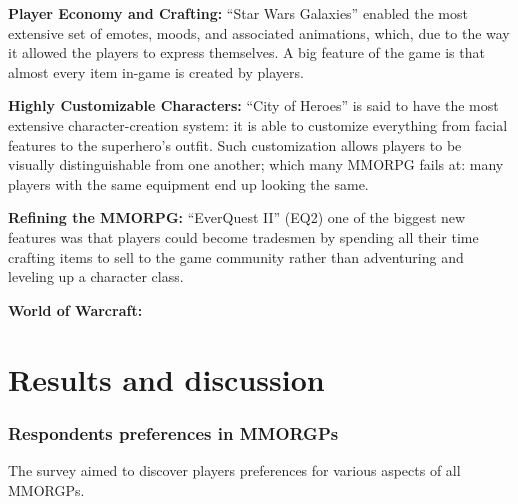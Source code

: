     {\bf Player Economy and Crafting:} ``Star Wars Galaxies'' enabled the most extensive set of emotes, moods, and associated animations, which, due to the way it allowed the players to express themselves. A big feature of the game is that almost every item in-game is created by players. 

    {\bf Highly Customizable Characters:} ``City of Heroes'' is said to have the most extensive character-creation system: it is able to customize everything from facial features to the superhero's outfit. Such customization allows players to be visually distinguishable from one another; which many MMORPG fails at: many players with the same equipment end up looking the same. 

    {\bf Refining the MMORPG:} ``EverQuest II'' (EQ2) one of the biggest new features was that players could become tradesmen by spending all their time crafting items to sell to the game community rather than adventuring and leveling up a character class. 

    {\bf World of Warcraft:} 

  \section*{Results and discussion}

    \subsubsection*{Respondents preferences in MMORGPs}
    The survey aimed to discover players preferences for various aspects of all MMORGPs. 

